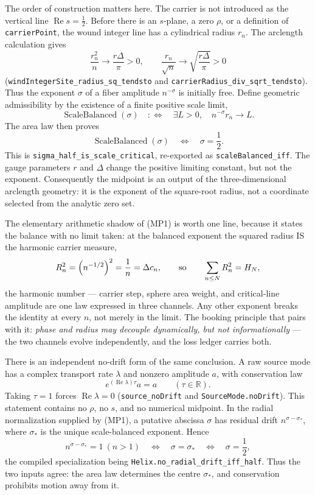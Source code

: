 \documentclass[11pt]{article}
\theoremstyle{definition}
\renewcommand{\Re}{\operatorname{Re}}
\begin{document}
The order of construction matters here.  The carrier is not introduced as
the vertical line \(\Re s=\tfrac12\).  Before there is an \(s\)-plane, a
zero \(\rho\), or a definition of \texttt{carrierPoint}, the wound integer
line has a cylindrical radius \(r_n\).  The arclength calculation gives
\[
  \frac{r_n^2}{n}\longrightarrow \frac{r\Delta}{\pi}>0,
  \qquad
  \frac{r_n}{\sqrt n}\longrightarrow
     \sqrt{\frac{r\Delta}{\pi}}>0
\]
(\texttt{windIntegerSite\_radius\_sq\_tendsto} and
\texttt{carrierRadius\_div\_sqrt\_tendsto}).  Thus the exponent
\(\sigma\) of a fiber amplitude \(n^{-\sigma}\) is initially free.  Define
geometric admissibility by the existence of a finite positive scale limit,
\[
 \operatorname{ScaleBalanced}(\sigma)
 \quad:\Longleftrightarrow\quad
 \exists L>0,
 \quad n^{-\sigma}r_n\longrightarrow L.
\]
The area law then proves
\[
 \operatorname{ScaleBalanced}(\sigma)
 \quad\Longleftrightarrow\quad
 \sigma=\frac12.
 \tag{MP1}\label{eq:grh-midpoint-area-law}
\]
This is \texttt{sigma\_half\_is\_scale\_critical}, re-exported as
\texttt{scaleBalanced\_iff}.  The gauge parameters \(r\) and \(\Delta\)
change the positive limiting constant, but not the exponent.  Consequently
the midpoint is an output of the three-dimensional arclength geometry: it
is the exponent of the square-root radius, not a coordinate selected from
the analytic zero set.

The elementary arithmetic shadow of (MP1) is worth one line, because it
states the balance with no limit taken: at the balanced exponent the
squared radius IS the harmonic carrier measure,
\[
  R_n^2=\Bigl(n^{-1/2}\Bigr)^{2}=\frac1n=\Delta c_n,
  \qquad\text{so}\qquad
  \sum_{n\le N}R_n^2=H_N,
\]
the harmonic number --- carrier step, sphere area weight, and
critical-line amplitude are one law expressed in three channels.  Any
other exponent breaks the identity at every \(n\), not merely in the
limit.  The booking principle that pairs with it: \emph{phase and radius
may decouple dynamically, but not informationally} --- the two channels
evolve independently, and the loss ledger carries both.

There is an independent no-drift form of the same conclusion.  A raw
source mode has a complex transport rate \(\lambda\) and nonzero amplitude
\(a\), with conservation law
\[
  e^{(\Re\lambda)\tau}a=a\qquad(\tau\in\mathbb R).
\]
Taking \(\tau=1\) forces \(\Re\lambda=0\)
(\texttt{source\_noDrift} and \texttt{SourceMode.noDrift}).  This statement
contains no \(\rho\), no \(s\), and no numerical midpoint.  In the radial
normalization supplied by (MP1), a putative abscissa \(\sigma\) has residual
drift \(n^{\sigma-\sigma_*}\), where
\(\sigma_*\) is the unique scale-balanced exponent.  Hence
\[
  n^{\sigma-\sigma_*}=1\ (n>1)
  \quad\Longleftrightarrow\quad \sigma=\sigma_*
  \quad\Longleftrightarrow\quad \sigma=\frac12,
 \tag{MP2}\label{eq:grh-midpoint-drift}
\]
the compiled specialization being
\texttt{Helix.no\_radial\_drift\_iff\_half}.  Thus the two inputs agree:
the area law determines the centre \(\sigma_*\), and conservation prohibits
motion away from it.
\end{document}
